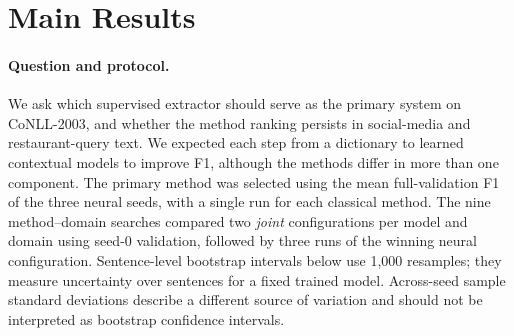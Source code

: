 \begingroup
\setlength{\emergencystretch}{2em}

\section{Main Results}
\label{sec:b-main-results}

\paragraph{Question and protocol.}
We ask which supervised extractor should serve as the primary system on
CoNLL-2003, and whether the method ranking persists in social-media and
restaurant-query text. We expected each step from a dictionary to learned
contextual models to improve F1, although the methods differ in more than one
component. The primary method was selected using the mean full-validation F1
of the three neural seeds, with a single run for each classical method. The
nine method--domain searches compared two \emph{joint} configurations per
model and domain using seed-0 validation, followed by three runs of the winning
neural configuration. Sentence-level bootstrap intervals below use 1,000
resamples; they measure uncertainty over sentences for a fixed trained model.
Across-seed sample standard deviations describe a different source of
variation and should not be interpreted as bootstrap confidence intervals.


